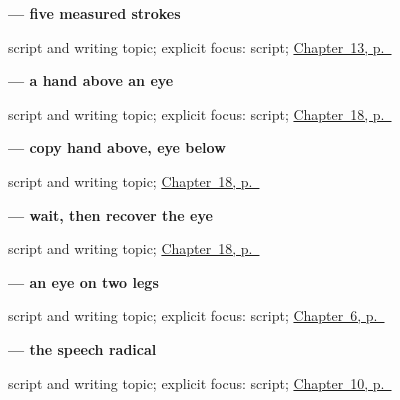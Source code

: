 \noindent\begin{minipage}[t]{\linewidth}
\raggedright
\textbf{ — five measured strokes}\par
\footnotesize script and writing topic; explicit focus: script; \hyperref[ch:zh-school-six]{Chapter~13, p.~\pageref*{ch:zh-school-six}}
\end{minipage}\par\smallskip

\noindent\begin{minipage}[t]{\linewidth}
\raggedright
\textbf{ — a hand above an eye}\par
\footnotesize script and writing topic; explicit focus: script; \hyperref[ch:zh-looking-reading]{Chapter~18, p.~\pageref*{ch:zh-looking-reading}}
\end{minipage}\par\smallskip

\noindent\begin{minipage}[t]{\linewidth}
\raggedright
\textbf{ — copy hand above, eye below}\par
\footnotesize script and writing topic; \hyperref[ch:zh-looking-reading]{Chapter~18, p.~\pageref*{ch:zh-looking-reading}}
\end{minipage}\par\smallskip

\noindent\begin{minipage}[t]{\linewidth}
\raggedright
\textbf{ — wait, then recover the eye}\par
\footnotesize script and writing topic; \hyperref[ch:zh-looking-reading]{Chapter~18, p.~\pageref*{ch:zh-looking-reading}}
\end{minipage}\par\smallskip

\noindent\begin{minipage}[t]{\linewidth}
\raggedright
\textbf{ — an eye on two legs}\par
\footnotesize script and writing topic; explicit focus: script; \hyperref[ch:zh-zaijian]{Chapter~6, p.~\pageref*{ch:zh-zaijian}}
\end{minipage}\par\smallskip

\noindent\begin{minipage}[t]{\linewidth}
\raggedright
\textbf{ — the speech radical}\par
\footnotesize script and writing topic; explicit focus: script; \hyperref[ch:zh-xiexie]{Chapter~10, p.~\pageref*{ch:zh-xiexie}}
\end{minipage}\par\smallskip

